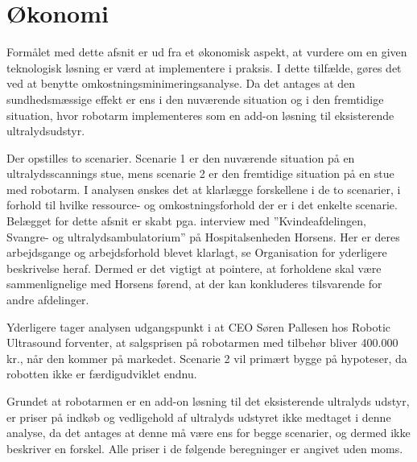\chapter{Økonomi} \label{Okonomi}
Formålet med dette afsnit er ud fra et økonomisk aspekt, at vurdere om en given teknologisk løsning er værd at implementere i praksis. I dette tilfælde, gøres det ved at benytte omkostningsminimeringsanalyse. Da det antages at den sundhedsmæssige effekt er ens i den nuværende situation og i den fremtidige situation, hvor robotarm implementeres som en add-on løsning til eksisterende ultralydsudstyr. 

Der opstilles to scenarier. Scenarie 1 er den nuværende situation på en ultralydsscannings stue, mens scenarie 2 er den fremtidige situation på en stue med robotarm. I analysen ønskes det at klarlægge forskellene i de to scenarier, i forhold til hvilke ressource- og omkostningsforhold der er i det enkelte scenarie. Belægget for dette afsnit er skabt pga. interview med ”Kvindeafdelingen, Svangre- og ultralydsambulatorium” på Hospitalsenheden Horsens. Her er deres arbejdsgange og arbejdsforhold blevet klarlagt, se Organisation for yderligere beskrivelse heraf. Dermed er det vigtigt at pointere, at forholdene skal være sammenlignelige med Horsens førend, at der kan konkluderes tilsvarende for andre afdelinger. 

Yderligere tager analysen udgangspunkt i at CEO Søren Pallesen hos Robotic Ultrasound forventer, at salgsprisen på robotarmen med tilbehør bliver 400.000 kr., når den kommer på markedet. Scenarie 2 vil primært bygge på hypoteser, da robotten ikke er færdigudviklet endnu. 

Grundet at robotarmen er en add-on løsning til det eksisterende ultralyds udstyr, er priser på indkøb og vedligehold af ultralyds udstyret ikke medtaget i denne analyse, da det antages at denne må være ens for begge scenarier, og dermed ikke beskriver en forskel. Alle priser i de følgende beregninger er angivet uden moms. 


